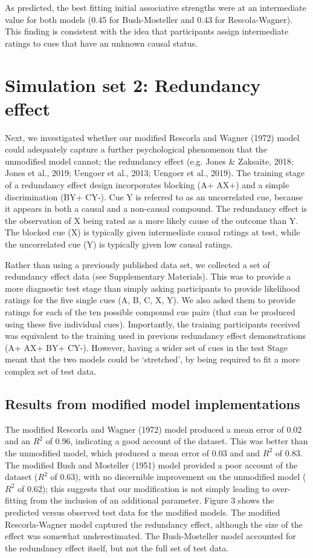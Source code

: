 \documentclass[twocolumn]{article}
\begin{document}
As predicted, the best fitting initial associative strengths were at an
intermediate value for both models (0.45 for Bush-Mosteller and 0.43 for
Rescola-Wagner). This finding is consistent with the idea that
participants assign intermediate ratings to cues that have an unknown
causal status.

\section{Simulation set 2: Redundancy effect}

Next, we investigated whether our modified Rescorla and Wagner (1972)
model could adequately capture a further psychological phenomenon that
the unmodified model cannot; the redundancy effect (e.g. Jones \&
Zaksaite, 2018; Jones et al., 2019; Uengoer et al., 2013; Uengoer et
al., 2019). The training stage of a redundancy effect design
incorporates blocking (A+ AX+) and a simple discrimination (BY+ CY-).
Cue Y is referred to as an uncorrelated cue, because it appears in both
a causal and a non-causal compound. The redundancy effect is the
observation of X being rated as a more likely cause of the outcome than
Y. The blocked cue (X) is typically given intermediate causal ratings at
test, while the uncorrelated cue (Y) is typically given low causal
ratings.

Rather than using a previously published data set, we collected a set of
redundancy effect data (see Supplementary Materials). This was to
provide a more diagnostic test stage than simply asking participants to
provide likelihood ratings for the five single cues (A, B, C, X, Y). We
also asked them to provide ratings for each of the ten possible compound
cue pairs (that can be produced using these five individual cues).
Importantly, the training participants received was equivalent to the
training used in previous redundancy effect demonstrations (A+ AX+ BY+
CY-). However, having a wider set of cues in the test Stage meant that
the two models could be `stretched', by being required to fit a more
complex set of test data.

\subsection{Results from modified model implementations}

The modified Rescorla and Wagner (1972) model produced a mean error of
0.02 and an $R^2$ of 0.96, indicating a good account of
the dataset. This was better than the unmodified model, which produced a
mean error of 0.03 and and $R^2$ of 0.83. The modified
Bush and Mosteller (1951) model provided a poor account of the dataset
($R^2$ of 0.63), with no discernible improvement on the
unmodified model ($R^2$ of 0.62); this suggests that our
modification is not simply leading to over-fitting from the inclusion of
an additional parameter. Figure 3 shows the predicted versus observed
test data for the modified models. The modified Rescorla-Wagner model
captured the redundancy effect, although the size of the effect was
somewhat underestimated. The Bush-Mosteller model accounted for the
redundancy effect itself, but not the full set of test data.
\end{document}
